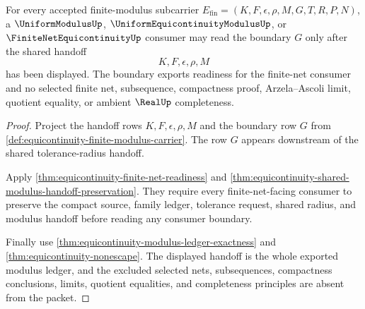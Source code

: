 \begin{theorem}
\label{thm:equicontinuity-uniform-modulus-consumer}
For every accepted finite-modulus subcarrier $E_{\mathrm{fin}}=(K,F,\epsilon,\rho,M,G,T,R,P,N)$, a $\UniformModulusUp$, $\UniformEquicontinuityModulusUp$, or $\FiniteNetEquicontinuityUp$ consumer may read the boundary $G$ only after the shared handoff
$$
K,F,\epsilon,\rho,M
$$
has been displayed. The boundary exports readiness for the finite-net consumer and no selected finite net, subsequence, compactness proof, Arzela--Ascoli limit, quotient equality, or ambient $\RealUp$ completeness.
\end{theorem}
\begin{proof}
Project the handoff rows $K,F,\epsilon,\rho,M$ and the boundary row $G$ from \autoref{def:equicontinuity-finite-modulus-carrier}. The row $G$ appears downstream of the shared tolerance-radius handoff.

Apply \autoref{thm:equicontinuity-finite-net-readiness} and \autoref{thm:equicontinuity-shared-modulus-handoff-preservation}. They require every finite-net-facing consumer to preserve the compact source, family ledger, tolerance request, shared radius, and modulus handoff before reading any consumer boundary.

Finally use \autoref{thm:equicontinuity-modulus-ledger-exactness} and \autoref{thm:equicontinuity-nonescape}. The displayed handoff is the whole exported modulus ledger, and the excluded selected nets, subsequences, compactness conclusions, limits, quotient equalities, and completeness principles are absent from the packet.
\end{proof}

